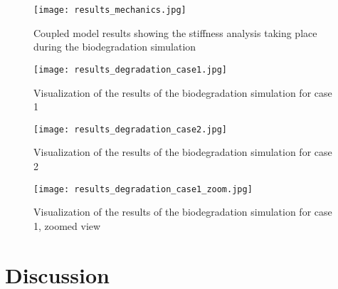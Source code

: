 \begin{figure}[h]
\centering
\medskip
\texttt{[image: results\_mechanics.jpg]}
\caption[Coupled model results showing the stiffness analysis taking place during biodegradation simulation]{Coupled model results showing the stiffness analysis taking place during the biodegradation simulation} \label{fig:infill_results_mechanics}
\end{figure}


\begin{figure}[h]
\centering
\medskip
\texttt{[image: results\_degradation\_case1.jpg]}
\caption[Visualization of the results of the biodegradation simulation for case 1]{Visualization of the results of the biodegradation simulation for case 1} \label{fig:infill_results_degradation_case1}
\end{figure}


\begin{figure}[h]
\centering
\medskip
\texttt{[image: results\_degradation\_case2.jpg]}
\caption[Visualization of the results of the biodegradation simulation for case 2]{Visualization of the results of the biodegradation simulation for case 2} \label{fig:infill_results_degradation_case2}
\end{figure}


\begin{figure}[h]
\centering
\medskip
\texttt{[image: results\_degradation\_case1\_zoom.jpg]}
\caption[Zoom view of the results of the biodegradation simulation for case 1]{Visualization of the results of the biodegradation simulation for case 1, zoomed view} \label{fig:infill_results_degradation_case1_zoom}
\end{figure}

\section{Discussion}


\cleardoublepage

